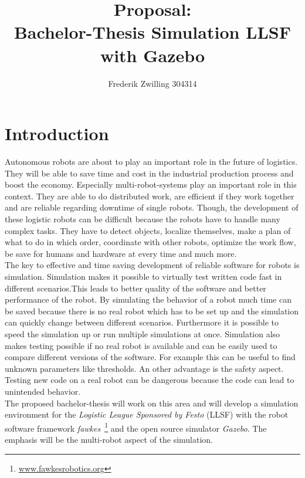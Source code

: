 \documentclass[11pt,a4paper,titlepage]{article}
\author{Frederik Zwilling 304314}
\title{Proposal:\\ Bachelor-Thesis Simulation LLSF with Gazebo}
\begin{document}
\maketitle

\section{Introduction}
Autonomous robots are about to play an important role in the future of logistics. They will be able to save time and cost in the industrial production process and boost the economy. Especially multi-robot-systems play an important role in this context. They are able to do distributed work, are efficient if they work together and are reliable regarding downtime of single robots. Though, the development of these logistic robots can be difficult because the robots have to handle many complex tasks. They have to detect objects, localize themselves, make a plan of what to do in which order, coordinate with other robots, optimize the work flow, be save for humans and hardware at every time and much more.\\
The key to effective and time saving development of reliable software for robots is simulation. Simulation makes it possible to virtually test written code fast in different scenarios.This leads to better quality of the software and better performance of the robot. By simulating the behavior of a robot much time can be saved because there is no real robot which has to be set up and the simulation can quickly change between different scenarios. Furthermore it is possible to speed the simulation up or run multiple simulations at once. Simulation also makes testing possible if no real robot is available and can be easily used to compare different versions of the software. For example this can be useful to find unknown parameters like thresholds. An other advantage is the safety aspect. Testing new code on a real robot can be dangerous because the code can lead to unintended behavior.\\
The proposed bachelor-thesis will work on this area and will develop a simulation environment for the \textit{Logistic League Sponsored by Festo} (LLSF) with the robot software framework \textit{fawkes}~\footnote{\url{www.fawkesrobotics.org}} and the open source simulator \textit{Gazebo}. The emphasis will be the multi-robot aspect of the simulation.
\end{document}
